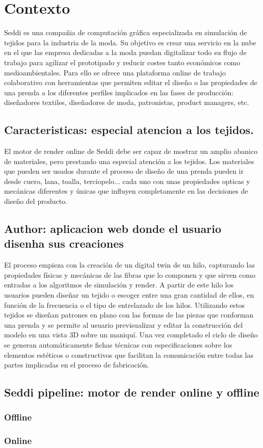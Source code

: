 \chapter{Contexto}
    Seddi es una compañia de computación gráfica especializada en simulación de tejidos para la
    industria de la moda.
    Su objetivo es crear una servicio en la nube en el que las empresa dedicadas a la moda puedan
    digitalizar todo su flujo de trabajo para agilizar el prototipado y reducir costes tanto económicos
    como medioambientales. Para ello se ofrece una plataforma online de trabajo colaborativo con
    herramientas que permiten editar el diseño o las propiedades de una prenda a los diferentes
    perfiles implicados en las fases de producción: diseñadores textiles, diseñadores de moda,
    patronistas, product managers, etc.

\section{Caracteristicas: especial atencion a los tejidos.}
    El motor de render online de Seddi debe ser capaz de mostrar un amplio abanico de materiales,
    pero prestando una especial atenci\'on a los tejidos. Los materiales que pueden ser usados durante
    el proceso de dise\~no de una prenda pueden ir desde cuero, lana, toalla, terciopelo... cada uno
    con unas propiedades opticas y mec\'anicas diferentes y \'unicas que influyen completamente en las
    decisiones de dise\~no del producto.

\section{Author: aplicacion web donde el usuario disenha sus creaciones}
    El proceso empieza con la creación de un digital twin de un hilo, capturando las propiedades
    físicas y mecánicas de las fibras que lo componen y que sirven como entradas a los algoritmos de
    simulación y render. A partir de este hilo los usuarios pueden diseñar un tejido o escoger entre
    una gran cantidad de ellos, en función de la frecuencia o el tipo de entrelazado de los hilos.
    Utilizando estos tejidos se diseñan patrones en plano con las formas de las piezas que conforman
    una prenda y se permite al usuario previsualizar y editar la construcción del modelo en una vista
    3D sobre un maniquí. Una vez completado el ciclo de diseño se generan automáticamente fichas técnicas
    con especificaciones sobre los elementos estéticos o constructivos que facilitan la comunicación
    entre todas las partes implicadas en el proceso de fabricación.
    
\section{Seddi pipeline: motor de render online y offline}
    \subsection{Offline}
    \subsection{Online}
